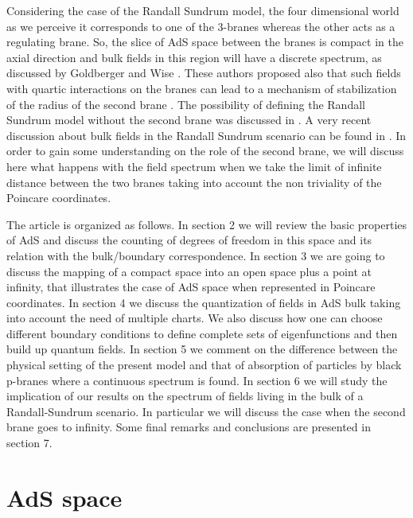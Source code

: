 \documentclass[a4paper,12pt]{article}
\begin{document}
Considering the case of the Randall Sundrum model, the four
dimensional world as we perceive it  corresponds 
to one of the  3-branes whereas the other  acts as a regulating brane. 
So, the slice of AdS space between the branes is compact in the axial 
direction and  bulk fields in this region will have a discrete spectrum,
as discussed by Goldberger and Wise \cite{GW1}. 
These authors  proposed also that such fields with quartic interactions on 
the branes can lead to a mechanism of stabilization of the radius 
\coordHE{} of the second brane \cite{GW2}.
The possibility of defining the Randall Sundrum model without
the second brane was discussed in \cite{DK}.
A very recent discussion about bulk fields in the Randall Sundrum scenario
can be found in \cite{Ran}.
In order to gain some understanding on the role of the second brane,
we will discuss here what happens with the field spectrum when we 
take the limit of infinite distance between the two branes taking 
into account the non triviality of the Poincare coordinates.


The article is organized as follows. In section 2 we will review the 
basic properties of AdS and discuss the counting of degrees of freedom
in this space and its relation with the bulk/boundary correspondence.
In section 3 we are going to discuss the mapping of a
compact space into an open space plus a point at infinity, that illustrates
the case of AdS space when represented in Poincare coordinates.  
In section 4 we discuss the quantization of fields in AdS bulk taking
into account the need of multiple charts.
We also discuss how one can choose different boundary conditions
to define complete sets of eigenfunctions and then build up quantum fields.
In section 5 we comment on the difference between the physical setting
of the present model and that of absorption of particles by black p-branes
where a continuous spectrum is found.
In section 6 we will study the implication of our results on the  
spectrum of fields living in the bulk of a Randall-Sundrum
scenario. In particular we will discuss the case when the second brane 
goes to infinity. Some final remarks and conclusions are presented 
in section 7.



\bigskip

\section{AdS space}
\end{document}
